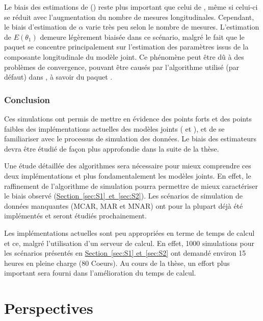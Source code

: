 \documentclass[11pt, a4paper]{article}
\begin{document}
\par{Le biais des estimations de  () reste plus important que celui de ,
même si celui-ci se réduit avec l'augmentation du nombre de mesures longitudinales.
Cependant, le biais d'estimation de $\alpha$ varie très peu selon le nombre de mesures.
L'estimation de $E(\theta_1)$ demeure légèrement biaisée dans ce scénario, malgré le fait que le paquet  se concentre principalement
sur l'estimation des paramètres issus de la composante longitudinale du modèle joint.
Ce phénomène peut être dû à des problèmes de convergence, pouvant être causés par l'algorithme utilisé (par défaut)
dans , à savoir  du paquet .}

\subsubsection{Conclusion}
\par{Ces simulations ont permis de mettre en évidence des points forts et des points faibles des implémentations actuelles
des modèles joints ( et ), et de se familiariser avec le processus de simulation des données.
Le biais des estimateurs devra être étudié de façon plus approfondie dans la suite de la thèse.}
\par{Une étude détaillée des algorithmes sera nécessaire pour mieux comprendre ces deux implémentations et
plus fondamentalement les modèles joints.
En effet, le raffinement de l'algorithme de simulation pourra permettre de mieux caractériser le biais observé (\hyperref[sec:S1]{Section~\ref*{sec:S1}~et~\ref{sec:S2}}).
Les scénarios de simulation de données manquantes (MCAR, MAR et MNAR) ont pour la plupart déjà été implémentés
et seront étudiés prochainement.}
\par{Les implémentations actuelles sont peu appropriées en terme de temps de calcul et ce, malgré l'utilisation d'un serveur de
calcul. En effet, 1000 simulations pour les scénarios présentés en \hyperref[sec:S1]{Section~\ref*{sec:S1} et~\ref{sec:S2}}
ont demandé environ 15 heures en pleine charge (80 Coeurs).
Au cours de la thèse, un effort plus important sera fourni dans l'amélioration du temps de calcul.}


\clearpage
\section{Perspectives}
\end{document}
